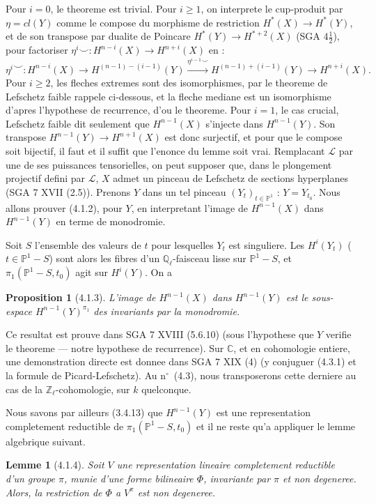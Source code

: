 \documentclass[12pt,a4paper]{article}
\theoremstyle{plain}
\newtheorem{lemma}[theorem]{Lemme}
\newtheorem{proposition}[theorem]{Proposition}
\theoremstyle{definition}
\theoremstyle{remark}
\newcommand{\bbC}{\mathbb{C}}
\newcommand{\bbP}{\mathbb{P}}
\newcommand{\scrL}{\mathscr{L}}
\newcommand{\Zl}{\mathbb{Z}_\ell}
\newcommand{\Ql}{\mathbb{Q}_\ell}
\begin{document}
Pour $i=0$, le theoreme est trivial. Pour $i \geq 1$, on interprete le cup-produit par $\eta = cl(Y)$ comme le compose du morphisme de restriction $H^*(X) \to H^*(Y)$, et de son transpose par dualite de Poincare $H^*(Y) \to H^{*+2}(X)$ (SGA $4\frac{1}{2}$), pour factoriser $\eta^i \smile : H^{n-i}(X) \to H^{n+i}(X)$ en :
\[
\eta^i \smile : H^{n-i}(X) \to H^{(n-1)-(i-1)}(Y) \xrightarrow{\eta^{i-1} \smile} H^{(n-1)+(i-1)}(Y) \to H^{n+i}(X).
\]
Pour $i \geq 2$, les fleches extremes sont des isomorphismes, par le theoreme de Lefschetz faible rappele ci-dessous, et la fleche mediane est un isomorphisme d'apres l'hypothese de recurrence, d'ou le theoreme. Pour $i=1$, le cas crucial, Lefschetz faible dit seulement que $H^{n-1}(X)$ s'injecte dans $H^{n-1}(Y)$. Son transpose $H^{n-1}(Y) \to H^{n+1}(X)$ est donc surjectif, et pour que le compose soit bijectif, il faut et il suffit que l'enonce du lemme soit vrai. Remplacant $\scrL$ par une de ses puissances tensorielles, on peut supposer que, dans le plongement projectif defini par $\scrL$, $X$ admet un pinceau de Lefschetz de sections hyperplanes (SGA 7 XVII (2.5)). Prenons $Y$ dans un tel pinceau $(Y_t)_{t \in \bbP^1}$ : $Y = Y_{t_0}$. Nous allons prouver (4.1.2), pour $Y$, en interpretant l'image de $H^{n-1}(X)$ dans $H^{n-1}(Y)$ en terme de monodromie.

Soit $S$ l'ensemble des valeurs de $t$ pour lesquelles $Y_t$ est singuliere. Les $H^i(Y_t)$ ($t \in \bbP^1 - S$) sont alors les fibres d'un $\Ql$-faisceau lisse sur $\bbP^1 - S$, et $\pi_1(\bbP^1 - S, t_0)$ agit sur $H^i(Y)$. On a

\begin{proposition}[4.1.3]
L'image de $H^{n-1}(X)$ dans $H^{n-1}(Y)$ est le sous-espace $H^{n-1}(Y)^{\pi_1}$ des invariants par la monodromie.
\end{proposition}

Ce resultat est prouve dans SGA 7 XVIII (5.6.10) (sous l'hypothese que $Y$ verifie le theoreme --- notre hypothese de recurrence). Sur $\bbC$, et en cohomologie entiere, une demonstration directe est donnee dans SGA 7 XIX (4) (y conjuguer (4.3.1) et la formule de Picard-Lefschetz). Au n$^\circ$~(4.3), nous transposerons cette derniere au cas de la $\Zl$-cohomologie, sur $k$ quelconque.

Nous savons par ailleurs (3.4.13) que $H^{n-1}(Y)$ est une representation completement reductible de $\pi_1(\bbP^1 - S, t_0)$ et il ne reste qu'a appliquer le lemme algebrique suivant.

\begin{lemma}[4.1.4]
Soit $V$ une representation lineaire completement reductible d'un groupe $\pi$, munie d'une forme bilineaire $\Phi$, invariante par $\pi$ et non degeneree. Alors, la restriction de $\Phi$ a $V^\pi$ est non degeneree.
\end{lemma}
\end{document}
